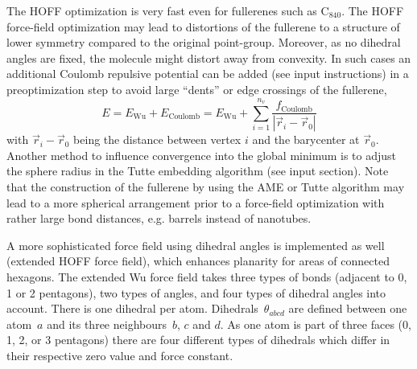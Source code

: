 \documentclass[article,a4paper,twoside]{memoir}
\newcommand{\C}[1]{\ensuremath{\mathrm{C}_{#1}}}
\begin{document}
The HOFF optimization is very fast even for fullerenes such as \C{840}. 
The HOFF force-field optimization may lead to distortions of the fullerene to a structure of lower symmetry compared to the original point-group. 
Moreover, as no dihedral angles are fixed, the molecule might distort away from convexity. In such cases an additional Coulomb repulsive potential can
be added (see input instructions) in a preoptimization step to avoid large ``dents'' or edge crossings of the fullerene,
\begin{equation}
  \label{eq:Ewu}
  E = E_{\mathrm{Wu}} + E_{\mathrm{Coulomb}} = E_{\mathrm{Wu}} + \sum_{i=1}^{n_v} \frac{f_{\mathrm{Coulomb}}}{|\vec{r}_i - \vec{r}_0|}
\end{equation}
with $\vec{r}_i - \vec{r}_0$ being the distance between vertex $i$ and the barycenter at $\vec{r}_0$. Another method to influence convergence into the global
minimum is to adjust the sphere radius in the Tutte embedding algorithm (see input section).
Note that the construction of the fullerene by using the AME or Tutte algorithm may
lead to a more spherical arrangement prior to a force-field optimization with rather large bond distances, 
e.g. barrels instead of nanotubes. 

A more sophisticated force field using dihedral angles is implemented as well (extended HOFF force field),
which enhances planarity for areas of connected hexagons. The extended Wu force field takes three types of bonds (adjacent to 0, 1 or 2 pentagons),
two types of angles, and four types of dihedral angles into account. There is one dihedral per atom.  Dihedrals~$\theta_{abcd}$ 
are defined between one atom~$a$ and its three neighbours~$b$, $c$ and $d$.  As one atom is part of three faces
(0, 1, 2, or 3 pentagons) there are four different types of dihedrals which differ in their respective
zero value and force constant.
\end{document}
